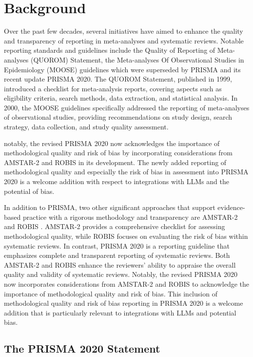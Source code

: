 \documentclass{article}
\begin{document}
\section{Background}


Over the past few decades, several initiatives have aimed to enhance the quality and transparency of reporting in meta-analyses and systematic reviews. Notable reporting standards and guidelines include the Quality of Reporting of Meta-analyses (QUOROM) \cite{moher1999improving} Statement, the Meta-analyses Of Observational Studies in Epidemiology (MOOSE) \cite{stroup2000meta} guidelines which were superseded by  PRISMA and its recent update PRISMA 2020. The QUOROM Statement, published in 1999, introduced a checklist for meta-analysis reports, covering aspects such as eligibility criteria, search methods, data extraction, and statistical analysis. In 2000, the MOOSE guidelines specifically addressed the reporting of meta-analyses of observational studies, providing recommendations on study design, search strategy, data collection, and study quality assessment.

notably, the revised PRISMA 2020 now acknowledges the importance of methodological quality and risk of bias by incorporating considerations from AMSTAR-2 and ROBIS in its development. 
The newly added reporting of methodological quality and especially the risk of bias in assessment into PRISMA 2020 is a welcome addition with respect to integrations with LLMs and the potential of bias.

In addition to PRISMA, two other significant approaches \cite{Kolaski2023}  that support evidence-based practice with a rigorous methodology and transparency are AMSTAR-2 \cite{shea2017amstar}  and ROBIS \cite{whiting2016robis}. AMSTAR-2 provides a comprehensive checklist for assessing methodological quality, while ROBIS focuses on evaluating the risk of bias within systematic reviews. In contrast, PRISMA 2020 is a reporting guideline that emphasizes complete and transparent reporting of systematic reviews. Both AMSTAR-2 and ROBIS enhance the reviewers' ability to appraise the overall quality and validity of systematic reviews. Notably, the revised PRISMA 2020 now incorporates considerations from AMSTAR-2 and ROBIS to acknowledge the importance of methodological quality and risk of bias. This inclusion of methodological quality and risk of bias reporting in PRISMA 2020 is a welcome addition that is particularly relevant to integrations with LLMs and potential bias.

\subsection{The PRISMA 2020 Statement}
\end{document}
